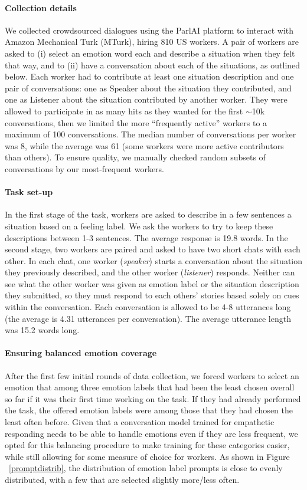 \documentclass[11pt,a4paper]{article}
\begin{document}
\paragraph{Collection details}
We collected crowdsourced dialogues using the ParlAI platform \citep{miller2017parlai} to interact with Amazon Mechanical Turk (MTurk), hiring 810 US workers. 
A pair of workers are asked to (i) select an emotion word each and describe a situation when they felt that way, and to (ii) have a conversation about each of the situations, as outlined below.  Each worker had to contribute at least one situation description and
one pair of conversations: one as Speaker about the situation they contributed, and one as Listener about the situation contributed by another worker.  They were allowed to participate in as many  hits as they wanted for the first $\sim$10k conversations, then we limited the more ``frequently active'' workers to a maximum of 100 conversations. The median number of conversations per worker was 8, while the average was 61 (some workers were more active contributors than others). To ensure quality, we manually checked random subsets of conversations by our most-frequent workers.

\paragraph{Task set-up}
In the first stage of the task, workers are asked to describe in a few sentences a situation based on a feeling label. 
We ask the workers to try to keep these descriptions between 1-3 sentences. The average response is 19.8 words.
In the second stage, two workers are paired and asked to have two short chats with each other.  In each chat, one worker (\emph{speaker}) starts a conversation about the situation they previously described, and the other worker (\emph{listener}) responds.  Neither can see what the other worker was given as emotion label or the situation description they submitted, so they must respond to each others' stories based solely on cues within the conversation. Each conversation is allowed to be 4-8 utterances long (the average is 4.31 utterances per conversation).  The average utterance length was 15.2 words long.

\paragraph{Ensuring balanced emotion coverage}
After the first few initial rounds of data collection, we forced workers to select an emotion that among three emotion labels that 
 had been the least chosen overall so far if it was their first
 time working on the task. If they had already performed
 the task, the offered emotion labels were among those that
 they had chosen the least often before.
Given that a conversation model trained for empathetic responding needs to be able to handle emotions even if they are less frequent, we opted for this balancing procedure to make training for these categories easier, while still allowing for some measure of choice for workers.  As shown in Figure ~\ref{promptdistrib}, the distribution of emotion label prompts is close to evenly distributed, with a few that are selected slightly more/less often.
\end{document}
